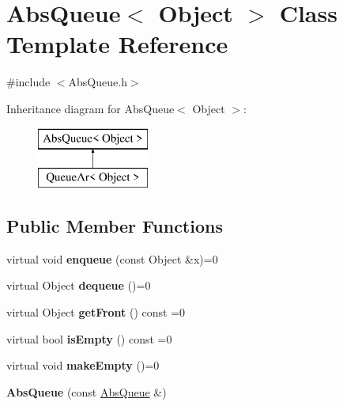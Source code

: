 \hypertarget{class_abs_queue}{}\section{Abs\+Queue$<$ Object $>$ Class Template Reference}
\label{class_abs_queue}


{\ttfamily \#include $<$Abs\+Queue.\+h$>$}

Inheritance diagram for Abs\+Queue$<$ Object $>$\+:\begin{figure}[H]
\begin{center}
\leavevmode
\includegraphics[height=2.000000cm]{class_abs_queue}
\end{center}
\end{figure}
\subsection*{Public Member Functions}
\begin{DoxyCompactItemize}
\item 
virtual void {\bfseries enqueue} (const Object \&x)=0\hypertarget{class_abs_queue_a172b69c1061e87a8f723b5f35d5234fe}{}\label{class_abs_queue_a172b69c1061e87a8f723b5f35d5234fe}

\item 
virtual Object {\bfseries dequeue} ()=0\hypertarget{class_abs_queue_a99c6bc5d463ea6c4c2b9cffa8c0a703b}{}\label{class_abs_queue_a99c6bc5d463ea6c4c2b9cffa8c0a703b}

\item 
virtual Object {\bfseries get\+Front} () const  =0\hypertarget{class_abs_queue_aa86da1126800e6bf2d363240ed858f4c}{}\label{class_abs_queue_aa86da1126800e6bf2d363240ed858f4c}

\item 
virtual bool {\bfseries is\+Empty} () const  =0\hypertarget{class_abs_queue_a012d3e8ad9ff8866a7ad2d75729ae3ba}{}\label{class_abs_queue_a012d3e8ad9ff8866a7ad2d75729ae3ba}

\item 
virtual void {\bfseries make\+Empty} ()=0\hypertarget{class_abs_queue_ac62860b01e9dc68fa6f4e6f217eb5e4f}{}\label{class_abs_queue_ac62860b01e9dc68fa6f4e6f217eb5e4f}

\item 
{\bfseries Abs\+Queue} (const \hyperlink{class_abs_queue}{Abs\+Queue} \&)\hypertarget{class_abs_queue_afe212750016489b7c2de53e61e30cffd}{}\label{class_abs_queue_afe212750016489b7c2de53e61e30cffd}

\end{DoxyCompactItemize}


